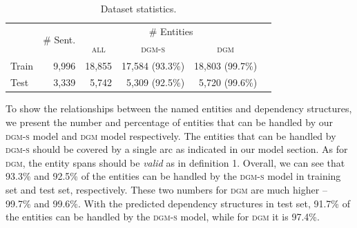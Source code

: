 \begin{table}[h!]
	\centering
	
	\begin{tabular}{lrrrrr}
		\toprule
		\multirow{2}{*}{} & \multirow{2}{*}{\# Sent.} & \multicolumn{3}{c}{\# Entities}\\
		\cline{3-5}
		&&\multicolumn{1}{c}{\textsc{all}}&\multicolumn{1}{c}{\textsc{dgm-s}}&\multicolumn{1}{c}{\textsc{dgm}}\\
		\midrule
		Train                   & 9,996                        & 18,855                         & 17,584 (93.3\%)               & 18,803 (99.7\%)                 \\
		Test			& 3,339                          & 5,742                         & 5,309 (92.5\%)               & 5,720 (99.6\%)               \\
		\bottomrule
	\end{tabular}
	
	\caption{Dataset statistics. }
	\label{tab:dgmstatistics}
\end{table}



To show the relationships between the named entities and dependency structures, we present the number and percentage of entities that can be handled by our \textsc{dgm-s} model and \textsc{dgm} model respectively.
The entities that can be handled by \textsc{dgm-s} should be covered by a single arc as indicated in our model section. As for \textsc{dgm}, the entity spans should be {\em valid} as in definition 1. 
Overall, we can see that 93.3\% and 92.5\% of the entities can be handled by the \textsc{dgm-s} model in training set and test set, respectively. 
These two numbers for \textsc{dgm} are much higher -- 99.7\% and 99.6\%. 
With the predicted dependency structures in test set, 91.7\% of the entities can be handled by the \textsc{dgm-s} model, while for \textsc{dgm} it is 97.4\%.


